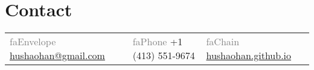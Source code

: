 
\section{\sc Contact}
\newcommand{\seticon}[1]{\textcolor{gray}{\csname #1\endcsname}}
\vspace{.01in}
\begin{tabular}{@{}p{2.11in}p{2.11in}p{2.11in}}
\seticon{faEnvelope} {\href{mailto:hushaohan@gmail.com}{hushaohan@gmail.com}}  &
\seticon{faPhone} +1 (413) 551-9674  &
\seticon{faChain} {\href{https://hushaohan.github.io}{hushaohan.github.io}}
\end{tabular}
